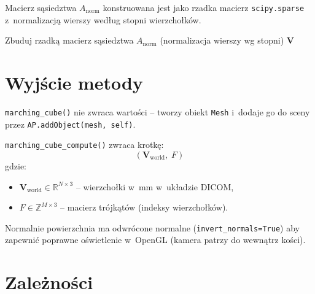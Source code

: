 \documentclass[12pt,a4paper]{article}
\begin{document}
Macierz sąsiedztwa $A_{\text{norm}}$ konstruowana jest jako rzadka macierz
\texttt{scipy.sparse} z~normalizacją wierszy według stopni wierzchołków.

\begin{algorithm}[H]
\caption{\textsc{TaubinSmooth} -- wygładzanie Taubina bez kurczenia}
\label{alg:taubin}
\BlankLine
Zbuduj rzadką macierz sąsiedztwa $A_{\text{norm}}$ (normalizacja wierszy wg stopni)\;
\Return $\mathbf{V}$\;
\end{algorithm}

\section{Wyjście metody}

\texttt{marching\_cube()} nie zwraca wartości -- tworzy obiekt \texttt{Mesh}
i~dodaje go do sceny przez \texttt{AP.addObject(mesh, self)}.

\texttt{marching\_cube\_compute()} zwraca krotkę:
\[
  (\mathbf{V}_{\text{world}},\; F)
\]
gdzie:
\begin{itemize}
  \item $\mathbf{V}_{\text{world}} \in \mathbb{R}^{N \times 3}$ -- wierzchołki
    w~mm w~układzie DICOM,
  \item $F \in \mathbb{Z}^{M \times 3}$ -- macierz trójkątów (indeksy wierzchołków).
\end{itemize}

Normalnie powierzchnia ma odwrócone normalne (\texttt{invert\_normals=True})
aby zapewnić poprawne oświetlenie w~OpenGL (kamera patrzy do wewnątrz kości).

\section{Zależności}
\end{document}
